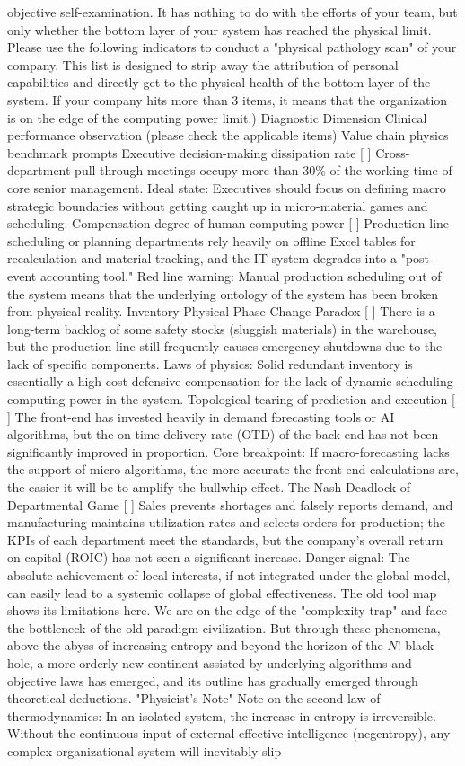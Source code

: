 \documentclass[11pt,a4paper]{article}
\begin{document}
objective self-examination. It has nothing to do with the efforts of your team, but only whether the bottom layer of your system has reached the physical limit. Please use the following indicators to conduct a "physical pathology scan" of your company. This list is designed to strip away the attribution of personal capabilities and directly get to the physical health of the bottom layer of the system. If your company hits more than 3 items, it means that the organization is on the edge of the computing power limit.) Diagnostic Dimension Clinical performance observation (please check the applicable items) Value chain physics benchmark prompts Executive decision-making dissipation rate [ ] Cross-department pull-through meetings occupy more than 30\% of the working time of core senior management. Ideal state: Executives should focus on defining macro strategic boundaries without getting caught up in micro-material games and scheduling. Compensation degree of human computing power [ ] Production line scheduling or planning departments rely heavily on offline Excel tables for recalculation and material tracking, and the IT system degrades into a "post-event accounting tool." Red line warning: Manual production scheduling out of the system means that the underlying ontology of the system has been broken from physical reality. Inventory Physical Phase Change Paradox [ ] There is a long-term backlog of some safety stocks (sluggish materials) in the warehouse, but the production line still frequently causes emergency shutdowns due to the lack of specific components. Laws of physics: Solid redundant inventory is essentially a high-cost defensive compensation for the lack of dynamic scheduling computing power in the system. Topological tearing of prediction and execution [ ] The front-end has invested heavily in demand forecasting tools or AI algorithms, but the on-time delivery rate (OTD) of the back-end has not been significantly improved in proportion. Core breakpoint: If macro-forecasting lacks the support of micro-algorithms, the more accurate the front-end calculations are, the easier it will be to amplify the bullwhip effect. The Nash Deadlock of Departmental Game [ ] Sales prevents shortages and falsely reports demand, and manufacturing maintains utilization rates and selects orders for production; the KPIs of each department meet the standards, but the company's overall return on capital (ROIC) has not seen a significant increase. Danger signal: The absolute achievement of local interests, if not integrated under the global model, can easily lead to a systemic collapse of global effectiveness. The old tool map shows its limitations here. We are on the edge of the "complexity trap" and face the bottleneck of the old paradigm civilization. But through these phenomena, above the abyss of increasing entropy and beyond the horizon of the $N!$ black hole, a more orderly new continent assisted by underlying algorithms and objective laws has emerged, and its outline has gradually emerged through theoretical deductions. "Physicist's Note" Note on the second law of thermodynamics: In an isolated system, the increase in entropy is irreversible. Without the continuous input of external effective intelligence (negentropy), any complex organizational system will inevitably slip 
\end{document}
